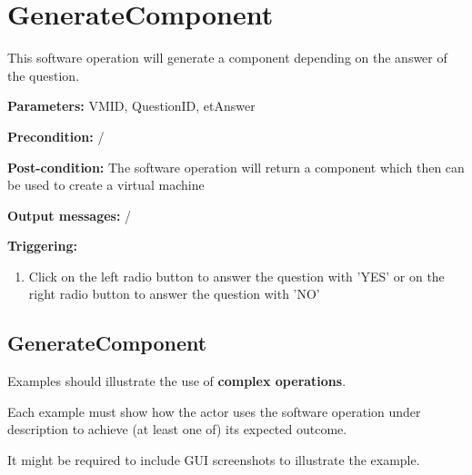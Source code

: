 \section{GenerateComponent}
\label{operation:GenerateComponent}
This software operation will generate a component depending on the answer of the
question.
\begin{description}

\item \textbf{Parameters:} VMID, QuestionID, etAnswer
\item \textbf{Precondition:} /
\item \textbf{Post-condition:} The software operation will return a component
which then can be used to create a virtual machine
\item \textbf{Output messages:} /

\item \textbf{Triggering:}
\begin{enumerate}
\item Click on the left radio button to answer the question with ’YES’ or on 
the right radio button to answer the question with ’NO’

\end{enumerate}

 
\end{description}

\subsection{GenerateComponent}
Examples should illustrate the use of \textbf{complex operations}.

Each example must show how the actor uses the software operation under
description to achieve (at least one of) its expected outcome.

It might be required to include GUI screenshots to illustrate the example.









